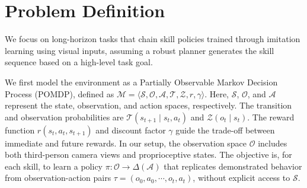 \section{Problem Definition}
\label{sec:problem_definition}



We focus on long-horizon tasks that chain skill policies trained through imitation learning using visual inputs, assuming a robust planner generates the skill sequence based on a high-level task goal.

We first model the environment as a Partially Observable Markov Decision Process (POMDP), defined as $\mathcal{M} = \langle \mathcal{S}, \mathcal{O}, \mathcal{A}, \mathcal{T}, \mathcal{Z}, r, \gamma \rangle$. Here, $\mathcal{S}$, $\mathcal{O}$, and $\mathcal{A}$ represent the state, observation, and action spaces, respectively. The transition and observation probabilities are $\mathcal{T}(s_{t+1} \mid s_t, a_t)$ and $\mathcal{Z}(o_t \mid s_t)$. The reward function $r(s_t, a_t, s_{t+1})$ and discount factor $\gamma$ guide the trade-off between immediate and future rewards. In our setup, the observation space $\mathcal{O}$ includes both third-person camera views and proprioceptive states. The objective is, for each skill, to learn a policy $\pi : \mathcal{O} \rightarrow \Delta(\mathcal{A})$ that replicates demonstrated behavior from observation-action pairs $\tau = (o_0, a_0, \cdots, o_t, a_t)$, without explicit access to $\mathcal{S}$.

